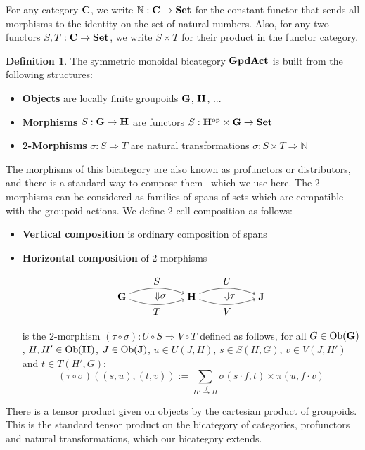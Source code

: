 \documentclass[a4paper,12pt]{article}
\theoremstyle{definition}
\newtheorem{defn}[theorem]{Definition}
\newcommand\cat[1]{{\ensuremath{\bf #1}}}
\newcommand\N{\ensuremath{\mathbb{N}}}
\renewcommand{\-}[0]{\nobreakdash-\hspace{0pt}}
\newcommand\op{\ensuremath{\mathrm{op}}}
\newcommand\Ob{\ensuremath{\mathrm{Ob}}}
\newcommand\GA{\cat{GpdAct}{}}
\begin{document}
For any category \cat C, we write $\N : \cat C \to \cat {Set}$ for the constant functor that sends all morphisms to the identity on the set of natural numbers. Also, for any two functors $S,T: \cat C \to \cat {Set}$, we write $S \times T$ for their product in the functor category.


\begin{defn}
The symmetric monoidal bicategory $\GA$ is built from the following structures:
\begin{itemize}
\item \textbf{Objects} are locally finite groupoids $\cat G$, $\cat H$, ...
\item \textbf{Morphisms} $S: \cat G \to \cat H$ are functors $S: \cat H ^\op \times \cat G \to \cat {Set}$
\item \textbf{2-Morphisms} $\sigma: S \Rightarrow T$ are natural transformations \mbox{$\sigma: S \times T \Rightarrow \N$}
\end{itemize}
\end{defn}

\noindent
The morphisms of this bicategory are also known as profunctors or distributors, and there is a standard way to compose them~\cite[Proposition 7.8.2]{borceux} which we use here. The 2\-morphisms can be considered as families of spans of sets which are compatible with the groupoid actions. We define 2\-cell composition as follows:
\begin{itemize}
\item \textbf{Vertical composition} is ordinary composition of spans
\item \textbf{Horizontal composition} of 2-morphisms

\vspace{-10pt}
$$\begin{tikzpicture}
\node (1) at (0,0) {\cat G};
\node (2) at (2.5,0) {\cat H};
\node (3) at (5,0) {\cat J};
\draw [->] (1) to [out=20, in=160] node (S) [above] {$S$} (2);
\draw [->] (1) to [out=-20, in=-160] node (T) [below] {$T$} (2);
\draw [->] (2) to [out=20, in=160] node (U) [above] {$U$} (3);
\draw [->] (2) to [out=-20, in=-160] node (V) [below] {$V$} (3);
\node [rotate=-90] (A) at (1.25,0) {$\Rightarrow$};
\node [anchor=west] at (A.center) {$\sigma$};
\node [rotate=-90] (A) at (3.75,0) {$\Rightarrow$};
\node [anchor=west] at (A.center) {$\tau$};
\end{tikzpicture}$$

\vspace{-10pt}
is the 2\-morphism $(\tau \circ \sigma) : U \circ S \Rightarrow V \circ T$ defined as follows, for all $G \in \Ob(\cat G)$, $H,H' \in \Ob(\cat H)$, $J \in \Ob(\cat J)$, $u \in U(J,H)$, $s \in S(H,G)$, $v \in V(J,H')$ and $t \in T(H',G)$:
$$(\tau \circ \sigma) ( (s,u), (t,v) ) := \sum _{H' \stackrel f \to H} \sigma (s \cdot f, t) \times \pi(u, f \cdot v)$$
\end{itemize}
There is a tensor product given on objects by the cartesian product of groupoids. This is the standard tensor product on the bicategory of categories, profunctors and natural transformations, which our bicategory extends.
\end{document}
